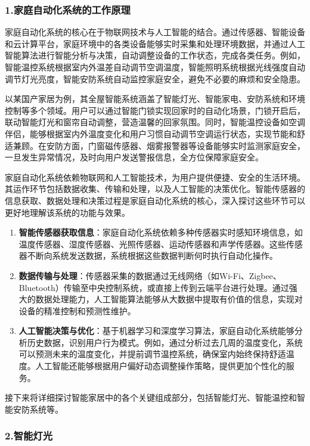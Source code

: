 \subsubsection{1.家庭自动化系统的工作原理}

家庭自动化系统的核心在于物联网技术与人工智能的结合。通过传感器、智能设备和云计算平台，家庭环境中的各类设备能够实时采集和处理环境数据，并通过人工智能算法进行智能分析与决策，自动调整设备的工作状态，完成各类任务。例如，智能温控系统根据室内外温差自动调节空调温度，智能照明系统根据光线强度自动调节灯光亮度，智能安防系统自动监控家庭安全，避免不必要的麻烦和安全隐患。

以某国产家居为例，其全屋智能系统涵盖了智能灯光、智能家电、安防系统和环境控制等多个领域。用户可以通过智能门锁实现回家时的自动化场景，门锁开启后，联动智能灯光和窗帘自动调整，营造温馨的回家氛围。同时，智能温控设备如空调伴侣，能够根据室内外温度变化和用户习惯自动调节空调运行状态，实现节能和舒适兼顾。在安防方面，门窗磁传感器、烟雾报警器等设备能够实时监测家庭安全，一旦发生异常情况，及时向用户发送警报信息，全方位保障家庭安全。

家庭自动化系统依赖物联网和人工智能技术，为用户提供便捷、安全的生活环境。其运作环节包括数据收集、传输和处理，以及人工智能的决策优化。智能传感器的信息获取、数据处理和决策过程是家庭自动化系统的核心，深入探讨这些环节可以更好地理解该系统的功能与效果。

\begin{enumerate}
    \item \textbf{智能传感器获取信息}：家庭自动化系统依赖多种传感器实时感知环境信息，如温度传感器、湿度传感器、光照传感器、运动传感器和声学传感器。这些传感器不断向系统发送数据，系统根据这些数据判断何时执行自动化操作。
    \item \textbf{数据传输与处理}：传感器采集的数据通过无线网络（如Wi-Fi、Zigbee、Bluetooth）传输至中央控制系统，或直接上传到云端平台进行处理。通过强大的数据处理能力，人工智能算法能够从大数据中提取有价值的信息，实现对设备的精准控制和预测性维护。
    \item \textbf{人工智能决策与优化}：基于机器学习和深度学习算法，家庭自动化系统能够分析历史数据，识别用户行为模式。例如，通过分析过去几周的温度变化，系统可以预测未来的温度变化，并提前调节温控系统，确保室内始终保持舒适温度。人工智能还能够根据用户偏好动态调整操作策略，提供更加个性化的服务。
\end{enumerate}

接下来将详细探讨智能家居中的各个关键组成部分，包括智能灯光、智能温控和智能安防系统等。

\subsubsection{2.智能灯光}

